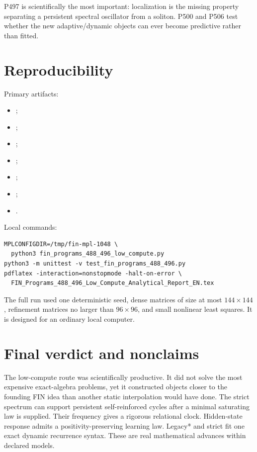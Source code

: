 \documentclass[11pt,a4paper]{article}
\theoremstyle{definition}
\theoremstyle{remark}
\begin{document}
P497 is scientifically the most important: localization is the missing property separating a persistent spectral oscillator from a soliton. P500 and P506 test whether the new adaptive/dynamic objects can ever become predictive rather than fitted.

\section{Reproducibility}

Primary artifacts:

\begin{itemize}
\item {};
\item {};
\item {};
\item {};
\item {};
\item {};
\item {}.
\end{itemize}

Local commands:

\begin{verbatim}
MPLCONFIGDIR=/tmp/fin-mpl-1048 \
  python3 fin_programs_488_496_low_compute.py
python3 -m unittest -v test_fin_programs_488_496.py
pdflatex -interaction=nonstopmode -halt-on-error \
  FIN_Programs_488_496_Low_Compute_Analytical_Report_EN.tex
\end{verbatim}

The full run used one deterministic seed, dense matrices of size at most $144\times144$, refinement matrices no larger than $96\times96$, and small nonlinear least squares. It is designed for an ordinary local computer.

\section{Final verdict and nonclaims}

The low-compute route was scientifically productive. It did not solve the most expensive exact-algebra problems, yet it constructed objects closer to the founding FIN idea than another static interpolation would have done. The strict spectrum can support persistent self-reinforced cycles after a minimal saturating law is supplied. Their frequency gives a rigorous relational clock. Hidden-state response admits a positivity-preserving learning law. Legacy* and strict fit one exact dynamic recurrence syntax. These are real mathematical advances within declared models.
\end{document}
